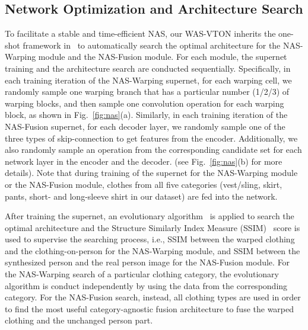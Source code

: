 \documentclass[sigconf]{acmart}
\begin{document}
\subsection{Network Optimization and Architecture Search}
To facilitate a stable and time-efficient NAS, our WAS-VTON inherits the one-shot framework in~\cite{zichao2019singlepath} to automatically search the optimal architecture for the NAS-Warping module and the NAS-Fusion module. For each module, the supernet training and the architecture search are conducted sequentially.
Specifically, in each training iteration of the NAS-Warping supernet, for each warping cell, we randomly sample one warping branch that has a particular number (1/2/3) of warping blocks, and then sample one convolution operation for each warping block, as shown in Fig.~\ref{fig:nas}(a). 
Similarly, in each training iteration of the NAS-Fusion supernet, for each decoder layer, we randomly sample one of the three types of skip-connection to get features from the encoder. Additionally, we also randomly sample an operation from the corresponding candidate set for each network layer in the encoder and the decoder.
(see Fig.~\ref{fig:nas}(b) for more details). 
Note that during training of the supernet for the NAS-Warping module or the NAS-Fusion module, clothes from all five categories 
(vest/sling, skirt, pants, short- and long-sleeve shirt in our dataset) are fed into the network.

After training the supernet, an evolutionary algorithm~\cite{ea} is applied to search the optimal architecture and the Structure Similarly Index Measure (SSIM)~\cite{2004SSIM} score is used to supervise the searching process, i.e., SSIM between the warped clothing and the clothing-on-person for the NAS-Warping module, and SSIM between the synthesized person and the real person image for the NAS-Fusion module.
For the NAS-Warping search of a particular clothing category, the evolutionary algorithm is conduct independently by using the data from the corresponding category.
For the NAS-Fusion search, instead, all clothing types are used in order to find the most useful category-agnostic fusion architecture to fuse the warped clothing and the unchanged person part.

\end{document}
